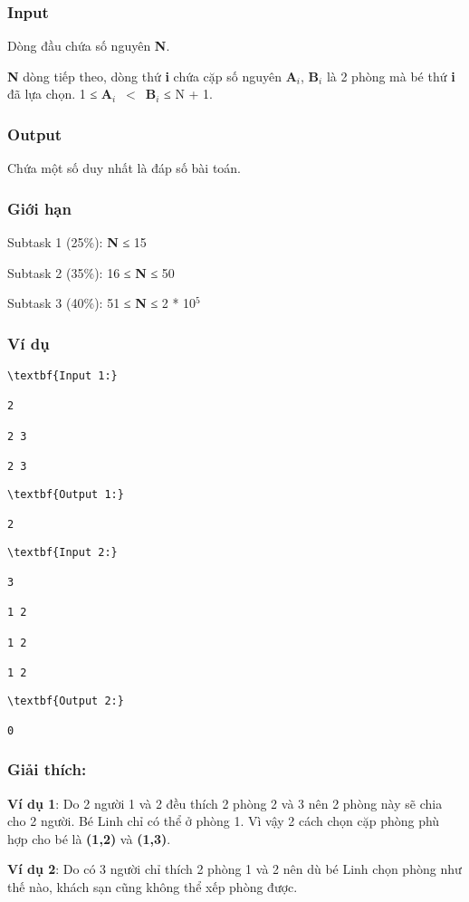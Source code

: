 \subsubsection{Input}

Dòng đầu chứa số nguyên \textbf{N}.

\textbf{N} dòng tiếp theo, dòng thứ \textbf{i} chứa cặp số nguyên \textbf{A$_i$}, \textbf{B$_i$} là 2 phòng mà bé thứ \textbf{i} đã lựa chọn. 1 ≤ \textbf{A$_i$} $<$ \textbf{B$_i$} ≤ N + 1.

\subsubsection{Output}

Chứa một số duy nhất là đáp số bài toán.

\subsubsection{Giới hạn}

Subtask 1 (25\%): \textbf{N} ≤ 15

Subtask 2 (35\%): 16 ≤ \textbf{N} ≤ 50

Subtask 3 (40\%): 51 ≤ \textbf{N} ≤ 2 * 10$^5$

\subsubsection{Ví dụ}
\begin{verbatim}
\textbf{Input 1:}

2

2 3

2 3

\end{verbatim}
\begin{verbatim}
\textbf{Output 1:}

2

\end{verbatim}
\begin{verbatim}
\textbf{Input 2:}

3

1 2

1 2

1 2

\end{verbatim}
\begin{verbatim}
\textbf{Output 2:}

0

\end{verbatim}

\subsubsection{Giải thích:}

\textbf{Ví dụ 1}: Do 2 người 1 và 2 đều thích 2 phòng 2 và 3 nên 2 phòng này sẽ chia cho 2 người. Bé Linh chỉ có thể ở phòng 1. Vì vậy 2 cách chọn cặp phòng phù hợp cho bé là \textbf{(1,2)} và \textbf{(1,3)}.

\textbf{Ví dụ 2}: Do có 3 người chỉ thích 2 phòng 1 và 2 nên dù bé Linh chọn phòng như thế nào, khách sạn cũng không thể xếp phòng được.